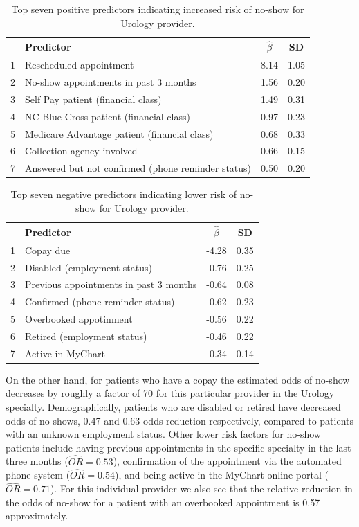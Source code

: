 \documentclass[twoside,11pt]{article}
\begin{document}
\begin{table}[H]
\footnotesize
\caption{Top seven positive predictors indicating increased risk of no-show for Urology provider.} 
\label{tb:highprv}
\centering
\begin{tabular}{llcc}
  \hline   \hline
 & \bf{Predictor} & $\hat{\beta}$ & SD \\ 
  \hline  \hline
 1 & Rescheduled appointment & 8.14 & 1.05 \\ 
  2 & No-show appointments in past 3 months & 1.56 & 0.20 \\ 
  3 & Self Pay patient (financial class) & 1.49 & 0.31 \\ 
  4 & NC Blue Cross patient (financial class) & 0.97 & 0.23 \\ 
  5 & Medicare Advantage patient (financial class) & 0.68 & 0.33 \\ 
  6 & Collection agency involved & 0.66 & 0.15 \\ 
  7 & Answered but not confirmed (phone reminder status) & 0.50 & 0.20 \\ 
   \hline
\end{tabular}
\end{table}

\vspace{-0.4cm}

\begin{table}[H]
\footnotesize
\caption{Top seven negative predictors indicating lower risk of no-show for Urology provider.}
\label{tb:lowprv}
\centering
\begin{tabular}{llcc}
  \hline  \hline
 & \bf{Predictor} & $\hat{\beta}$  & SD \\ 
 \hline  \hline
  1 & Copay due & -4.28 & 0.35 \\ 
  2 & Disabled (employment status) & -0.76 & 0.25 \\ 
  3 & Previous appointments in past 3 months & -0.64 & 0.08 \\ 
  4 & Confirmed (phone reminder status) & -0.62 & 0.23 \\ 
  5 & Overbooked appotinment & -0.56 & 0.22 \\ 
  6 & Retired (employment status)  & -0.46 & 0.22 \\ 
  7 & Active in MyChart  & -0.34 & 0.14 \\ 
   \hline
\end{tabular}
\end{table}

On the other hand, for patients who have a copay the estimated odds of no-show decreases by roughly a factor of 70 for this particular provider in the Urology specialty. Demographically, patients who are disabled or retired have decreased odds of no-shows, 0.47 and 0.63 odds reduction respectively, compared to patients with an unknown employment status. Other lower risk factors for no-show patients include having previous appointments in the specific specialty in the last three months ($\hat{OR}=0.53$), confirmation of the appointment via the automated phone system ($\hat{OR}=0.54$), and being active in the MyChart online portal ($\hat{OR}=0.71$). For this individual provider we also see that the relative reduction in the odds of no-show for a patient with an overbooked appointment is 0.57 approximately.
\end{document}

